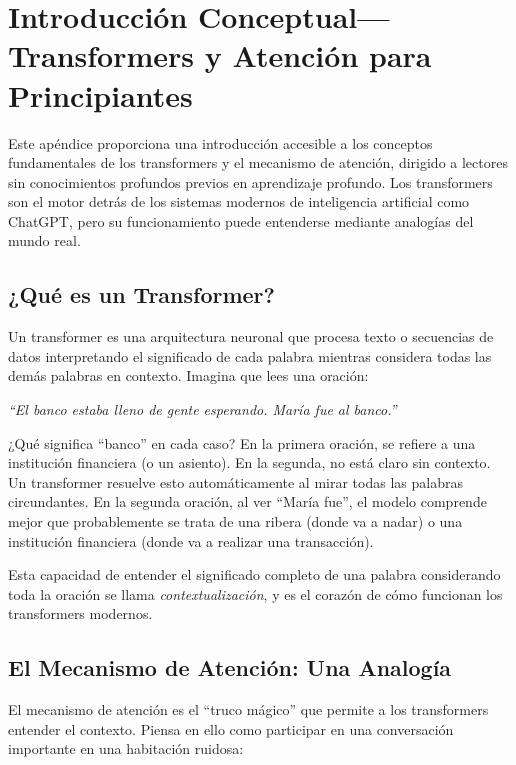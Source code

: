 \section{Introducción Conceptual---Transformers y Atención para Principiantes}
\label{sec:annex-tutorial}

Este apéndice proporciona una introducción accesible a los conceptos fundamentales de los transformers y el mecanismo de atención, dirigido a lectores sin conocimientos profundos previos en aprendizaje profundo. Los transformers son el motor detrás de los sistemas modernos de inteligencia artificial como ChatGPT, pero su funcionamiento puede entenderse mediante analogías del mundo real.

\subsection{¿Qué es un Transformer?}

Un transformer es una arquitectura neuronal que procesa texto o secuencias de datos interpretando el significado de cada palabra mientras considera todas las demás palabras en contexto. Imagina que lees una oración:

\begin{center}
\textit{``El banco estaba lleno de gente esperando. María fue al banco.''}
\end{center}

¿Qué significa ``banco'' en cada caso? En la primera oración, se refiere a una institución financiera (o un asiento). En la segunda, no está claro sin contexto. Un transformer resuelve esto automáticamente al mirar todas las palabras circundantes. En la segunda oración, al ver ``María fue'', el modelo comprende mejor que probablemente se trata de una ribera (donde va a nadar) o una institución financiera (donde va a realizar una transacción).

Esta capacidad de entender el significado completo de una palabra considerando toda la oración se llama \emph{contextualización}, y es el corazón de cómo funcionan los transformers modernos.

\subsection{El Mecanismo de Atención: Una Analogía}

El mecanismo de atención es el ``truco mágico'' que permite a los transformers entender el contexto. Piensa en ello como participar en una conversación importante en una habitación ruidosa:

